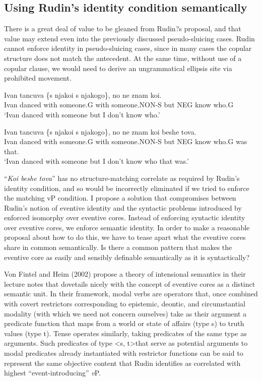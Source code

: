 \documentclass{turabian-researchpaper}
\begin{document}
\subsection{Using Rudin's identity condition semantically}
There is a great deal of value to be gleaned from Rudin?s proposal, and that value may extend even into the previously discussed pseudo-sluicing cases. Rudin cannot enforce identity in pseudo-sluicing cases, since in many cases the copular structure does not match the antecedent. At the same time, without use of a copular clause, we would need to derive an ungrammatical ellipsis site via prohibited movement. 

\begin{exe}
\gll Ivan tancuva \{s njakoi \textbar s njakogo\}, no ne znam koi. \\
Ivan danced with someone.G with someone.NON-S but NEG know who.G \\
\trans `Ivan danced with someone but I don't know who.'
\end{exe}

\begin{exe}
\ex\label{ivandanced7}
\gll Ivan tancuva \{s njakoi \textbar s njakogo\}, no ne znam koi beshe tova. \\
Ivan danced with someone.G with someone.NON-S but NEG know who.G was that. \\
\trans `Ivan danced with someone but I don't know who that was.'
\end{exe}

``\textit{Koi beshe tova}'' has no structure-matching correlate as required by Rudin's identity condition, and so would be incorrectly eliminated if we tried to enforce the matching vP condition. 
I propose a solution that compromises between Rudin's notion of eventive identity and the syntactic problems introduced by enforced isomorphy over eventive cores. Instead of enforcing syntactic identity over eventive cores, we enforce semantic identity. In order to make a reasonable proposal about how to do this, we have to tease apart what the eventive cores share in common semantically. Is there a common pattern that makes the eventive core as easily and sensibly definable semantically as it is syntactically?

Von Fintel and Heim (2002) propose a theory of intensional semantics in their lecture notes that dovetails nicely with the concept of eventive cores as a distinct semantic unit. In their framework, modal verbs are operators that, once combined with covert restrictors corresponding to epistemic, deontic, and circumstantial modality (with which we need not concern ourselves) take as their argument a predicate function that maps from a world or state of affairs (type s) to truth values (type t). Tense operates similarly, taking predicates of the same type as arguments. Such predicates of type \textless s, t\textgreater that serve as potential arguments to modal predicates already instantiated with restrictor functions can be said to represent the same objective content that Rudin identifies as correlated with highest ``event-introducing'' \textit{v}P.
\end{document}
